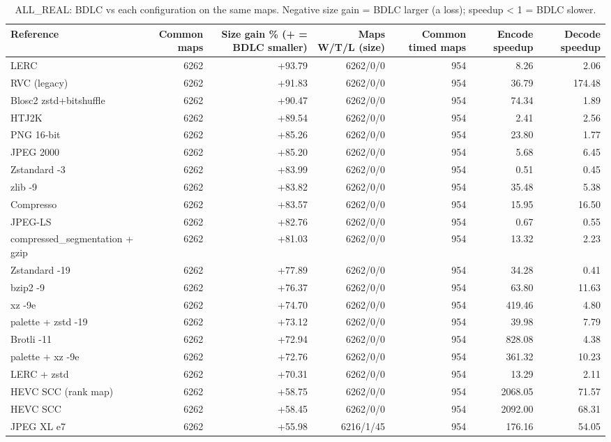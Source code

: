 \begin{table}[t]
\centering
\caption{ALL\_REAL: BDLC vs each configuration on the same maps. Negative size gain = BDLC larger (a loss); speedup < 1 = BDLC slower.}
\begin{tabular}{lrrrrrr}
\hline
Reference & Common maps & Size gain \% (+ = BDLC smaller) & Maps W/T/L (size) & Common timed maps & Encode speedup & Decode speedup \\
\hline
LERC & 6262 & +93.79 & 6262/0/0 & 954 & 8.26 & 2.06 \\
RVC (legacy) & 6262 & +91.83 & 6262/0/0 & 954 & 36.79 & 174.48 \\
Blosc2 zstd+bitshuffle & 6262 & +90.47 & 6262/0/0 & 954 & 74.34 & 1.89 \\
HTJ2K & 6262 & +89.54 & 6262/0/0 & 954 & 2.41 & 2.56 \\
PNG 16-bit & 6262 & +85.26 & 6262/0/0 & 954 & 23.80 & 1.77 \\
JPEG 2000 & 6262 & +85.20 & 6262/0/0 & 954 & 5.68 & 6.45 \\
Zstandard -3 & 6262 & +83.99 & 6262/0/0 & 954 & 0.51 & 0.45 \\
zlib -9 & 6262 & +83.82 & 6262/0/0 & 954 & 35.48 & 5.38 \\
Compresso & 6262 & +83.57 & 6262/0/0 & 954 & 15.95 & 16.50 \\
JPEG-LS & 6262 & +82.76 & 6262/0/0 & 954 & 0.67 & 0.55 \\
compressed\_segmentation + gzip & 6262 & +81.03 & 6262/0/0 & 954 & 13.32 & 2.23 \\
Zstandard -19 & 6262 & +77.89 & 6262/0/0 & 954 & 34.28 & 0.41 \\
bzip2 -9 & 6262 & +76.37 & 6262/0/0 & 954 & 63.80 & 11.63 \\
xz -9e & 6262 & +74.70 & 6262/0/0 & 954 & 419.46 & 4.80 \\
palette + zstd -19 & 6262 & +73.12 & 6262/0/0 & 954 & 39.98 & 7.79 \\
Brotli -11 & 6262 & +72.94 & 6262/0/0 & 954 & 828.08 & 4.38 \\
palette + xz -9e & 6262 & +72.76 & 6262/0/0 & 954 & 361.32 & 10.23 \\
LERC + zstd & 6262 & +70.31 & 6262/0/0 & 954 & 13.29 & 2.11 \\
HEVC SCC (rank map) & 6262 & +58.75 & 6262/0/0 & 954 & 2068.05 & 71.57 \\
HEVC SCC & 6262 & +58.45 & 6262/0/0 & 954 & 2092.00 & 68.31 \\
JPEG XL e7 & 6262 & +55.98 & 6216/1/45 & 954 & 176.16 & 54.05 \\

\end{tabular}
\end{table}
